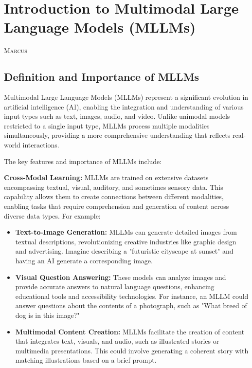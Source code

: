 \chapter{Introduction to Multimodal Large Language Models (MLLMs)}
\makeatletter
\newcommand{\chapterauthor}[1]{%
  {\parindent0pt\vspace*{-25pt}%
  \linespread{1.1}\large\scshape#1%
  \par\nobreak\vspace*{35pt}}
  \@afterheading%
}
\makeatother

\chapterauthor{Marcus}


\section{Definition and Importance of MLLMs}

Multimodal Large Language Models (MLLMs) represent a significant evolution in artificial intelligence (AI), enabling the integration and understanding of various input types such as text, images, audio, and video. Unlike unimodal models restricted to a single input type, MLLMs process multiple modalities simultaneously, providing a more comprehensive understanding that reflects real-world interactions.

The key features and importance of MLLMs include:

\textbf{Cross-Modal Learning:} MLLMs are trained on extensive datasets encompassing textual, visual, auditory, and sometimes sensory data. This capability allows them to create connections between different modalities, enabling tasks that require comprehension and generation of content across diverse data types. For example:

\begin{itemize}
    \item \textbf{Text-to-Image Generation:} MLLMs can generate detailed images from textual descriptions, revolutionizing creative industries like graphic design and advertising. Imagine describing a "futuristic cityscape at sunset" and having an AI generate a corresponding image.
    \item \textbf{Visual Question Answering:} These models can analyze images and provide accurate answers to natural language questions, enhancing educational tools and accessibility technologies. For instance, an MLLM could answer questions about the contents of a photograph, such as "What breed of dog is in this image?"
    \item \textbf{Multimodal Content Creation:} MLLMs facilitate the creation of content that integrates text, visuals, and audio, such as illustrated stories or multimedia presentations. This could involve generating a coherent story with matching illustrations based on a brief prompt.
\end{itemize}

